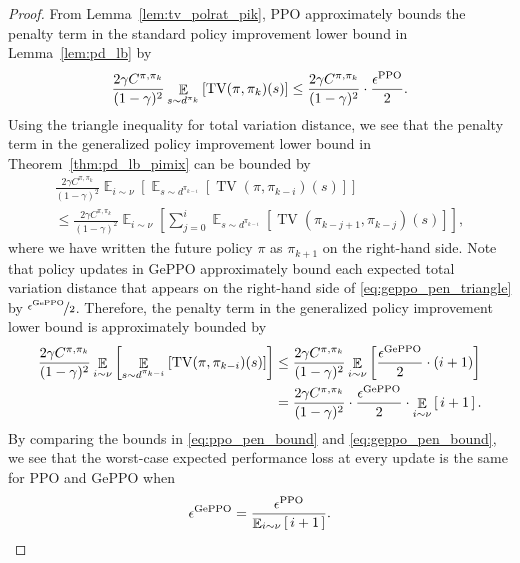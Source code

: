 \documentclass{article}
\begin{document}
\begin{proof}
From Lemma~\ref{lem:tv_polrat_pik}, PPO approximately bounds the penalty term in the standard policy improvement lower bound in Lemma~\ref{lem:pd_lb} by
\begin{equation}\label{eq:ppo_pen_bound}
\frac{2\gamma C^{\pi,\pi_k}}{(1-\gamma)^2} \mathop{\mathbb{E}}_{s \sim d^{\pi_k}} \left[ \operatorname{TV}(\pi,\pi_k)(s) \right] \leq \frac{2\gamma C^{\pi,\pi_k}}{(1-\gamma)^2} \cdot \frac{\epsilon^{\textnormal{PPO}}}{2}.
\end{equation}
Using the triangle inequality for total variation distance, we see that the penalty term in the generalized policy improvement lower bound in Theorem~\ref{thm:pd_lb_pimix} can be bounded by
\begin{multline}\label{eq:geppo_pen_triangle}
\frac{2 \gamma C^{\pi,\pi_k}}{(1-\gamma)^2} \mathop{\mathbb{E}}_{i \sim \nu} \left[  \mathop{\mathbb{E}}_{s \sim d^{\pi_{k-i}}} \left[ \operatorname{TV}(\pi,\pi_{k-i})(s) \right] \right] \\ \leq \frac{2 \gamma C^{\pi,\pi_k}}{(1-\gamma)^2} \mathop{\mathbb{E}}_{i \sim \nu} \left[ \sum_{j=0}^{i} \mathop{\mathbb{E}}_{s \sim d^{\pi_{k-i}}} \left[ \operatorname{TV}(\pi_{k-j+1},\pi_{k-j})(s) \right] \right],
\end{multline}
where we have written the future policy $\pi$ as $\pi_{k+1}$ on the right-hand side. Note that policy updates in GePPO approximately bound each expected total variation distance that appears on the right-hand side of \eqref{eq:geppo_pen_triangle} by $\nicefrac{\epsilon^{\textnormal{GePPO}}}{2}$. Therefore, the penalty term in the generalized policy improvement lower bound is approximately bounded by
\begin{equation}\label{eq:geppo_pen_bound}
\begin{split}
\frac{2 \gamma C^{\pi,\pi_k}}{(1-\gamma)^2} \mathop{\mathbb{E}}_{i \sim \nu} \left[  \mathop{\mathbb{E}}_{s \sim d^{\pi_{k-i}}} \left[ \operatorname{TV}(\pi,\pi_{k-i})(s) \right] \right] & \leq \frac{2 \gamma C^{\pi,\pi_k}}{(1-\gamma)^2} \mathop{\mathbb{E}}_{i \sim \nu} \left[ \frac{\epsilon^{\textnormal{GePPO}}}{2} \cdot (i+1)  \right] \\
&= \frac{2 \gamma C^{\pi,\pi_k}}{(1-\gamma)^2} \cdot \frac{\epsilon^{\textnormal{GePPO}}}{2} \cdot \mathop{\mathbb{E}}_{i \sim \nu} \left[ \, i+1 \, \right].
\end{split}
\end{equation}
By comparing the bounds in \eqref{eq:ppo_pen_bound} and \eqref{eq:geppo_pen_bound}, we see that the worst-case expected performance loss at every update is the same for PPO and GePPO when
\begin{equation}
\epsilon^{\textnormal{GePPO}} = \frac{\epsilon^{\textnormal{PPO}}}{ \mathop{\mathbb{E}}_{i \sim \nu} \left[ \, i + 1 \, \right]}.
\end{equation}
\end{proof}
\end{document}
